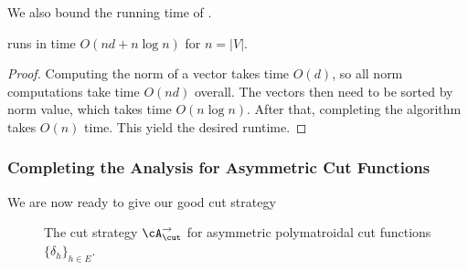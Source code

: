 \documentclass[letterpaper]{article}
\begin{document}
We also bound the running time of \dirroundcut.

\begin{lemma}
\label{lem.asym-cut-strat.dirroundcut-runtime}
\dirroundcut runs in time $O(nd + n \log n)$ for $n = \lvert V \rvert$.
\end{lemma}
\begin{proof}
Computing the norm of a vector takes time $O(d)$, so all norm computations take time $O(nd)$ overall. The vectors then need to be sorted by norm value, which takes time $O(n \log n)$. After that, completing the algorithm takes $O(n)$ time. This yield the desired runtime.
\end{proof}

\subsubsection{Completing the Analysis for Asymmetric Cut Functions}

We are now ready to give our good cut strategy

\begin{figure}[h]
\centering
\noindent{}

\caption{The cut strategy $\cA_{\cut}^{\rightarrow}$ for asymmetric polymatroidal cut functions $\{ \delta_h \}_{h \in E}$.}
\end{figure}
\end{document}
